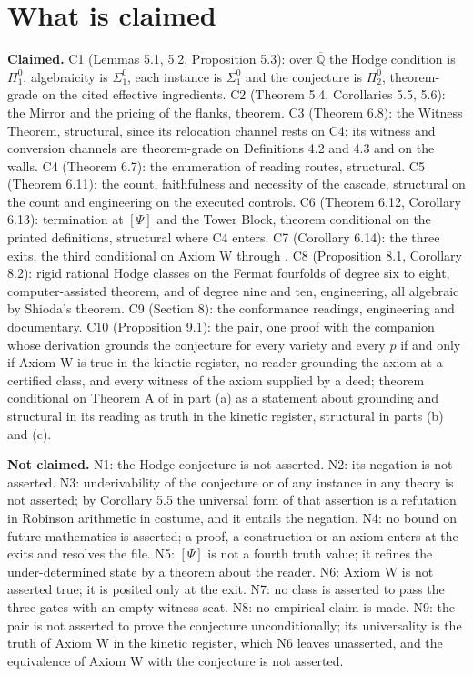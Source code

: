\documentclass[10pt,twocolumn]{article}
\begin{document}
\hypertarget{what-is-claimed}{%
\section{What is claimed}\label{what-is-claimed}}

\textbf{Claimed.} C1 (Lemmas 5.1, 5.2, Proposition 5.3): over
\(\overline{\mathbb{Q}}\) the Hodge condition is \(\Pi^0_1\),
algebraicity is \(\Sigma^0_1\), each instance is \(\Sigma^0_1\) and the
conjecture is \(\Pi^0_2\), theorem-grade on the cited effective
ingredients. C2 (Theorem 5.4, Corollaries 5.5, 5.6): the Mirror and the
pricing of the flanks, theorem. C3 (Theorem 6.8): the Witness Theorem,
structural, since its relocation channel rests on C4; its witness and
conversion channels are theorem-grade on Definitions 4.2 and 4.3 and on
the walls. C4 (Theorem 6.7): the enumeration of reading routes,
structural. C5 (Theorem 6.11): the count, faithfulness and necessity of
the cascade, structural on the count and engineering on the executed
controls. C6 (Theorem 6.12, Corollary 6.13): termination at \([\Psi]\)
and the Tower Block, theorem conditional on the printed definitions,
structural where C4 enters. C7 (Corollary 6.14): the three exits, the
third conditional on Axiom W through \cite{islam2026w}. C8 (Proposition
8.1, Corollary 8.2): rigid rational Hodge classes on the Fermat
fourfolds of degree six to eight, computer-assisted theorem, and of
degree nine and ten, engineering, all algebraic by Shioda's theorem. C9
(Section 8): the conformance readings, engineering and documentary. C10
(Proposition 9.1): the pair, one proof with the companion whose
derivation grounds the conjecture for every variety and every \(p\) if
and only if Axiom W is true in the kinetic register, no reader grounding
the axiom at a certified class, and every witness of the axiom supplied
by a deed; theorem conditional on Theorem A of \cite{islam2026w} in part
(a) as a statement about grounding and structural in its reading as
truth in the kinetic register, structural in parts (b) and (c).

\textbf{Not claimed.} N1: the Hodge conjecture is not asserted. N2: its
negation is not asserted. N3: underivability of the conjecture or of any
instance in any theory is not asserted; by Corollary 5.5 the universal
form of that assertion is a refutation in Robinson arithmetic in
costume, and it entails the negation. N4: no bound on future mathematics
is asserted; a proof, a construction or an axiom enters at the exits and
resolves the file. N5: \([\Psi]\) is not a fourth truth value; it
refines the under-determined state by a theorem about the reader. N6:
Axiom W is not asserted true; it is posited only at the exit. N7: no
class is asserted to pass the three gates with an empty witness seat.
N8: no empirical claim is made. N9: the pair is not asserted to prove
the conjecture unconditionally; its universality is the truth of Axiom W
in the kinetic register, which N6 leaves unasserted, and the equivalence
of Axiom W with the conjecture is not asserted.
\end{document}
